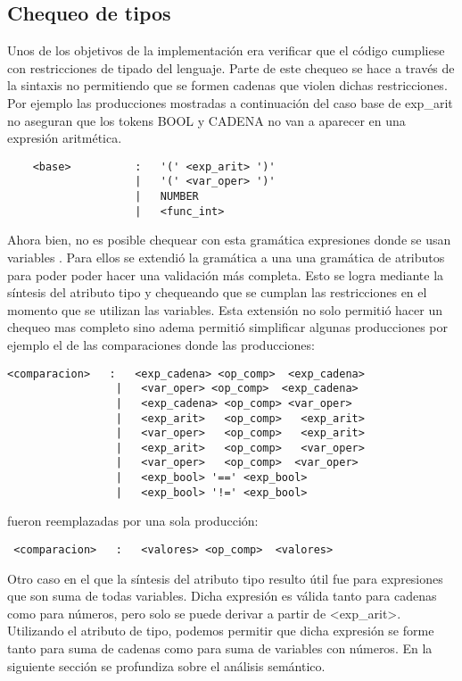 \subsection{Chequeo de tipos}

Unos de los objetivos de la implementación era verificar que el código cumpliese con restricciones de tipado del lenguaje. Parte de este chequeo se hace a través de la sintaxis no permitiendo  que se formen cadenas que violen dichas restricciones. 
Por ejemplo las producciones mostradas a continuación del caso  base de exp\_arit no aseguran que los tokens BOOL y CADENA no van a aparecer en una expresión aritmética. 
\begin{verbatim}
    <base>          :   '(' <exp_arit> ')'
                    |   '(' <var_oper> ')'
                    |   NUMBER
                    |   <func_int>

\end{verbatim}
	Ahora bien, no es posible chequear con esta gramática expresiones donde se usan variables . Para ellos se extendió la gramática a una una gramática de atributos para poder poder hacer una validación más completa. Esto se logra mediante la síntesis del atributo tipo y chequeando que se cumplan las restricciones en el momento que se utilizan las variables. Esta extensión no solo permitió hacer un chequeo mas completo sino adema permitió simplificar algunas producciones por ejemplo el de las comparaciones donde las producciones:
    
\begin{verbatim}
<comparacion>   :   <exp_cadena> <op_comp>  <exp_cadena>
                 |   <var_oper> <op_comp>  <exp_cadena>
                 |   <exp_cadena> <op_comp> <var_oper> 
                 |   <exp_arit>   <op_comp>   <exp_arit>
                 |   <var_oper>   <op_comp>   <exp_arit>
                 |   <exp_arit>   <op_comp>   <var_oper>
                 |   <var_oper>   <op_comp>  <var_oper>
                 |   <exp_bool> '==' <exp_bool>
                 |   <exp_bool> '!=' <exp_bool>
\end{verbatim}
fueron reemplazadas por una sola producción:
\begin{verbatim}
 <comparacion>   :   <valores> <op_comp>  <valores>
\end{verbatim}
 
Otro caso en el que la síntesis del atributo tipo resulto útil fue para expresiones que son suma de todas variables. Dicha expresión es válida tanto para cadenas como para números, pero solo se puede derivar a partir de <exp\_arit>. Utilizando el atributo de tipo, podemos permitir que dicha expresión se forme tanto para suma de cadenas como para suma de variables con números.
    En la siguiente sección se profundiza sobre el análisis semántico.


